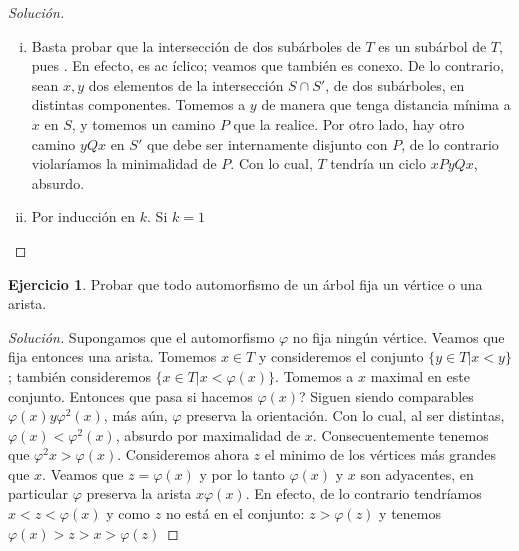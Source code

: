 \documentclass[12pt]{report}
\theoremstyle{plain}
\theoremstyle{definition}
\newtheorem{exercise}[theorem]{Ejercicio}
\newenvironment{solution}{\begin{proof}[Solución]}{\end{proof}}
\begin{document}
\begin{solution}
    \begin{enumerate}[(i)]
        \item Basta probar que la intersección de dos subárboles de $T$ es un subárbol de $T$, pues . En efecto, es ac
        íclico; veamos que también es conexo. De lo contrario, sean $x,y$ dos elementos de la intersección $S \cap S'$, de dos subárboles, en distintas componentes. Tomemos a $y$ de manera que tenga distancia mínima a $x$ en $S$, y tomemos un camino $P$ que la realice. Por otro lado, hay otro camino $yQx$ en $S'$ que debe ser internamente disjunto con $P$, de lo contrario violaríamos la minimalidad de $P$. Con lo cual, $T$ tendría un ciclo $x P y Q x$, absurdo.
        \item Por inducción en $k$. Si $k = 1$
    \end{enumerate}
\end{solution}



\begin{exercise}
    Probar que todo automorfismo de un árbol fija un vértice o una arista.
\end{exercise}
\begin{solution}
        Supongamos que el automorfismo $\varphi$ no fija ningún vértice. Veamos que fija entonces una arista. Tomemos $x \in T$ y consideremos el conjunto $\{ y \in T | x < y \}$; también consideremos $\{ x \in T | x < \varphi (x) \}$. Tomemos a $x$ maximal en este conjunto. Entonces que pasa si hacemos $\varphi (x)$? Siguen siendo comparables $\varphi (x) y \varphi^2 (x)$, más aún, $\varphi$ preserva la orientación. Con lo cual, al ser distintas,  $\varphi (x) < \varphi^2 (x)$, absurdo por maximalidad de $x$. Consecuentemente tenemos que $\varphi^2 x > \varphi (x)$. Consideremos ahora $z$ el minimo de los vértices más grandes que $x$. Veamos que $ z = \varphi (x)$ y por lo tanto $\varphi (x)$ y $x$ son adyacentes, en particular $\varphi$ preserva la arista $x \varphi(x)$. En efecto, de lo contrario tendríamos $x < z < \varphi (x)$ y como $z$ no está en el conjunto: $z > \varphi (z)$ y tenemos $\varphi (x) > z > x > \varphi (z)$
\end{solution}
\end{document}
